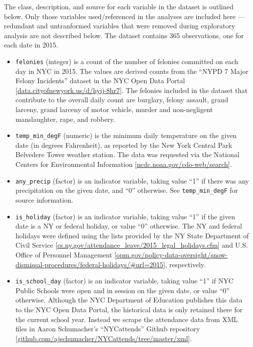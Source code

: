 \documentclass[11pt,notitlepage]{article}
\begin{document}
The class, description, and source for each variable in the dataset is outlined below. Only those variables used/referenced in the analyses are included here --- redundant and untranformed variables that were removed during exploratory analysis are not described below. The dataset contains 365 observations, one for each date in 2015.

\begin{itemize}
\setlength\itemsep{-1pt}

\item \texttt{felonies} (integer) is a count of the number of felonies committed on each day in NYC in 2015. The values are derived counts from the ``NYPD 7 Major Felony Incidents'' dataset in the NYC Open Data Portal [\href{https://data.cityofnewyork.us/Public-Safety/NYPD-7-Major-Felony-Incidents/hyij-8hr7}{data.cityofnewyork.us/d/hyij-8hr7}]. The felonies included in the dataset that contribute to the overall daily count are burglary, felony assault, grand larceny, grand larceny of motor vehicle, murder and non-negligent manslaughter, rape, and robbery.

\item \texttt{temp_min_degF} (numeric) is the minimum daily temperature on the given date (in degrees Fahrenheit), as reported by the New York Central Park Belvedere Tower weather station. The data was requested via the National Centers for Environmental Information [\href{http://www.ncdc.noaa.gov/cdo-web/search}{ncdc.noaa.gov/cdo-web/search}].


\item \texttt{any_precip} (factor) is an indicator variable, taking value ``1'' if there was any precipitation on the given date, and ``0'' otherwise. See \texttt{temp_min_degF} for source information.


\item \texttt{is_holiday} (factor) is an indicator variable, taking value ``1'' if the given date is a NY or federal holiday, or value ``0'' otherwise. The NY and federal holidays were defined using the lists provided by the NY State Department of Civil Service [\href{https://www.cs.ny.gov/attendance_leave/2015_legal_holidays.cfm}{cs.ny.gov/attendance_leave/2015_legal_holidays.cfm}] and U.S. Office of Personnel Management [\href{https://www.opm.gov/policy-data-oversight/snow-dismissal-procedures/federal-holidays/\#url=2015}{opm.gov/policy-data-oversight/snow-dismissal-procedures/federal-holidays/\#url=2015}], respectively.


\item \texttt{is_school_day} (factor) is an indicator variable, taking value ``1'' if NYC Public Schools were open and in session on the given date, or value ``0'' otherwise. Although the NYC Department of Education publishes this data to the NYC Open Data Portal, the historical data is only retained there for the current school year. Instead we scrape the attendance data from XML files in Aaron Schumacher's ``NYCattends'' Github repository [\href{https://github.com/ajschumacher/NYCattends/tree/master/xml}{github.com/ajschumacher/NYCattends/tree/master/xml}].



\end{itemize}
\end{document}
